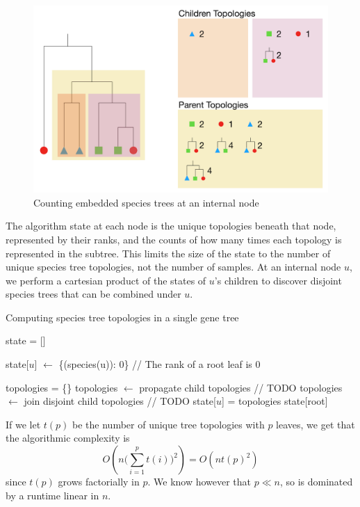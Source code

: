 \documentclass{article}
\begin{document}
\begin{figure}[H]
    \includegraphics[scale=0.5]{dp_alg}
    \centering
    \caption{Counting embedded species trees at an internal node}
    \label{fig:dp_alg}
\end{figure}

The algorithm state at each node is the unique topologies beneath that node,
represented by their ranks, and the
counts of how many times each topology is represented in the subtree. This
limits the size of the state to the number of unique species tree topologies,
not the number of samples. At an internal node $u$, we perform a cartesian
product of the states of $u$'s children to discover disjoint species trees that
can be combined under $u$.

\begin{algorithm}
    \caption{Computing species tree topologies in a single gene tree}
    \label{alg:dp_alg}
    \begin{algorithmic}
        \State state = []

        \State state[$u$] $\leftarrow$ \{(species(u)): 0\} // The rank of a root leaf is 0
        \EndFor

            \State topologies = \{\}
            \State topologies $\leftarrow$ propagate child topologies // TODO
            \State topologies $\leftarrow$ join disjoint child topologies // TODO
            \State state[$u$] = topologies
        \EndFor
        \State \Return state[root]
    \end{algorithmic}
\end{algorithm}
If we let $t(p)$ be the number of unique tree topologies with $p$ leaves,
we get that the algorithmic complexity is
\[
    O(n \big(\sum_{i=1}^p t(i)\big)^2) = O(n t(p)^2)
\]
since $t(p)$ grows factorially in $p$. We know however that $p \ll n$, so is
dominated by a runtime linear in $n$.
\end{document}

